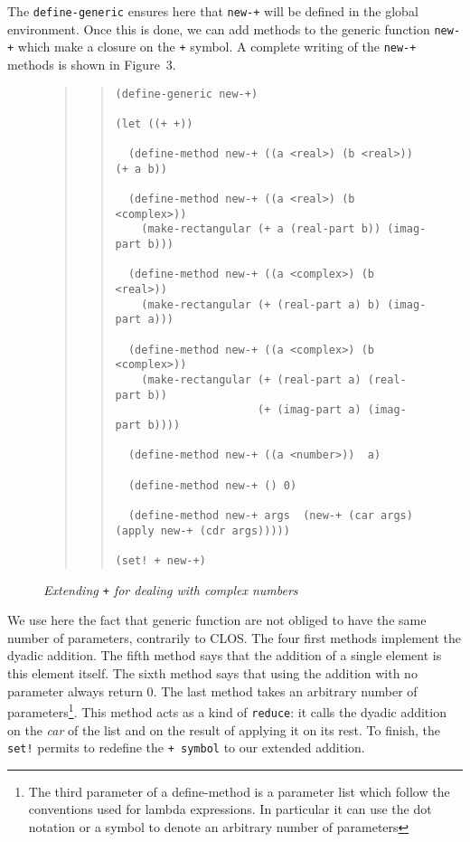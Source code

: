 {The {\tt define-generic} ensures here that {\tt new-+} will be defined in the global
environment. Once this is done, we can add methods to the generic function 
{\tt new-+} which make a closure on the {\tt +} symbol.
A complete writing of the {\tt new-+} methods is shown in Figure~3.

\begin{figure}
{\footnotesize
\begin{quote}
\begin{quote}
\begin{verbatim}
(define-generic new-+)

(let ((+ +))

  (define-method new-+ ((a <real>) (b <real>)) (+ a b))

  (define-method new-+ ((a <real>) (b <complex>)) 
    (make-rectangular (+ a (real-part b)) (imag-part b)))

  (define-method new-+ ((a <complex>) (b <real>))
    (make-rectangular (+ (real-part a) b) (imag-part a)))

  (define-method new-+ ((a <complex>) (b <complex>))
    (make-rectangular (+ (real-part a) (real-part b))
                      (+ (imag-part a) (imag-part b))))

  (define-method new-+ ((a <number>))  a)
  
  (define-method new-+ () 0)

  (define-method new-+ args  (new-+ (car args) (apply new-+ (cdr args)))))

(set! + new-+)
\end{verbatim}
\caption{\em Extending {\tt +} for dealing with complex numbers}
\end{quote}
\end{quote}
}
\end{figure}

\bigskip
We use here the fact that generic function are not obliged to have the same
number of parameters, contrarily to CLOS.  The four first methods
implement the dyadic addition. The fifth method says that the addition of a single
element is this element itself. The sixth method says that using the addition with
no parameter always return 0. The last method takes an arbitrary number of
parameters\footnote{The third parameter of a define-method is a parameter list
which follow the conventions used for lambda expressions. In particular it can
use the dot notation or a symbol to denote an arbitrary number of parameters}.
This method acts as a kind of {\tt reduce}: it calls the dyadic addition on
the {\em car} of the list and on the result of applying it on its rest.  To
finish, the {\tt set!} permits to redefine the {\tt + symbol} to our extended
addition.

}
